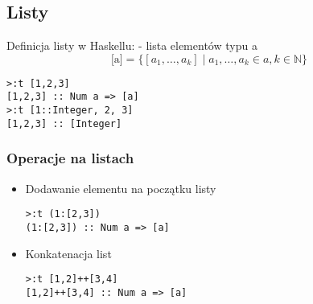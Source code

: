 \documentclass[11pt,a4paper]{article}
\begin{document}
\subsection{Listy}
Definicja listy w Haskellu:\newline
\text{[a]} - lista elementów typu a
\[
    \text{[a]} = \{[a_1, \dots, a_k] \mid a_1, \dots, a_k \in a, k \in \mathbb{N}\}
\]
\begin{Verbatim}[frame=single]
>:t [1,2,3]
[1,2,3] :: Num a => [a]
>:t [1::Integer, 2, 3]
[1,2,3] :: [Integer]
\end{Verbatim}
\subsubsection{Operacje na listach}
\begin{itemize}
    \item Dodawanie elementu na początku listy
        \begin{Verbatim}[frame=single]
>:t (1:[2,3])
(1:[2,3]) :: Num a => [a]
        \end{Verbatim}
    \item Konkatenacja list
        \begin{Verbatim}[frame=single]
>:t [1,2]++[3,4]
[1,2]++[3,4] :: Num a => [a]
        \end{Verbatim}
\end{itemize}
\end{document}
